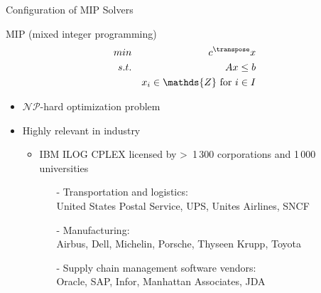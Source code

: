 \begin{frame}[c,fragile]{Configuration of MIP Solvers}

\begin{block}{MIP (mixed integer programming)}
\vspace*{-0.5cm}
\begin{eqnarray}
\nonumber{}min && c^\transpose x\\
\nonumber{}s.t. && Ax \le b\\
\nonumber{}&& x_i \in \mathds{Z} \text{ for } i \in I
\end{eqnarray}
\end{block}

\begin{itemize}
                \item $\mathcal{NP}$-hard optimization problem
                \item Highly relevant in industry
                \begin{itemize}
                       \item IBM ILOG CPLEX licensed by \textgreater\ 1\,300 corporations and 1\,000 universities
\pause 
                       \begin{itemize}
                        \item[-] Transportation and logistics:\\
                        United States Postal Service, UPS, Unites Airlines, SNCF 
                                        \smallskip
                        \item[-] Manufacturing:\\
                                Airbus, Dell, Michelin, Porsche, Thyseen Krupp, Toyota
                        \smallskip
                        \item[-] Supply chain management software vendors:\\
                                Oracle, SAP, Infor, Manhattan Associates, JDA
                        \end{itemize}
                \end{itemize}
\end{itemize}
        \vspace*{0.2cm}



\end{frame}


